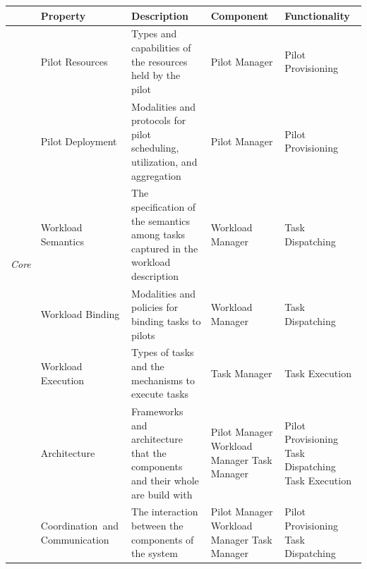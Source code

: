 \documentclass{sig-alternate}
\begin{document}
\begin{table}
\centering
\begin{tabular}{c|p{3.6cm}|p{5cm}|p{2.7cm}|p{2.7cm}|}
\cline{2-5}
                       &
\textbf{Property}      &
\textbf{Description}   &
\textbf{Component}     &
\textbf{Functionality} \\
\hline
\multirow{6}{*}{\textit{Core}}  &
Pilot Resources                 &
Types and capabilities of the resources held by the pilot &
Pilot Manager                   &
Pilot Provisioning              \\
\cline{2-5}
                                &
Pilot Deployment                &
Modalities and protocols for pilot scheduling, utilization, and aggregation &
Pilot Manager                   &
Pilot Provisioning \\
\cline{2-5}
                                &
Workload Semantics              &
The specification of the semantics among tasks captured in the workload
description &
Workload Manager                &
Task Dispatching \\
\cline{2-5}
                                &
Workload Binding                &
Modalities and policies for binding tasks to pilots &
Workload Manager                &
Task Dispatching \\
\cline{2-5}
                                &
Workload Execution              &
Types of tasks and the mechanisms to execute tasks &
Task Manager                    &
Task Execution \\
\hline
\multirow{10}{*}{\textit{Auxiliary}} &
Architecture                         &
Frameworks and architecture that the components and their whole are build
with &
Pilot Manager      \newline
  Workload Manager \newline
  Task Manager                       &
Pilot Provisioning \newline
  Task Dispatching \newline
  Task Execution \\
\cline{2-5}
                                     &
Coordination~and   \newline
  Communication                      &
The interaction between the components of the system &
Pilot Manager      \newline
  Workload Manager \newline
  Task Manager                       &
Pilot Provisioning \newline
  Task Dispatching \newline

\end{tabular}
\end{table}
\end{document}
